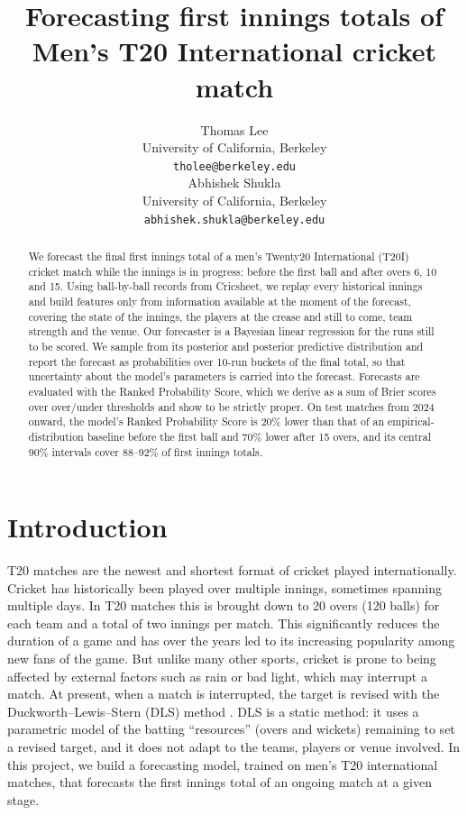 \documentclass{article}
\title{Forecasting first innings totals of Men's T20 International cricket match}
\author{
    {\hspace{1mm}Thomas Lee} \\
	University of California, Berkeley\\
	\texttt{tholee@berkeley.edu} \\
    \And
    {\hspace{1mm}Abhishek Shukla} \\
	University of California, Berkeley\\
	\texttt{abhishek.shukla@berkeley.edu} \\
}
\newcommand{\1}{\mathbf{1}}
\begin{document}
\maketitle

\begin{abstract}
We forecast the final first innings total of a men's Twenty20 International (T20I) cricket match while the innings is in progress: before the first ball and after overs 6, 10 and 15. Using ball-by-ball records from Cricsheet, we replay every historical innings and build features only from information available at the moment of the forecast, covering the state of the innings, the players at the crease and still to come, team strength and the venue. Our forecaster is a Bayesian linear regression for the runs still to be scored. We sample from its posterior and posterior predictive distribution and report the forecast as probabilities over 10-run buckets of the final total, so that uncertainty about the model's parameters is carried into the forecast. Forecasts are evaluated with the Ranked Probability Score, which we derive as a sum of Brier scores over over/under thresholds and show to be strictly proper. On test matches from 2024 onward, the model's Ranked Probability Score is 20\% lower than that of an empirical-distribution baseline before the first ball and 70\% lower after 15 overs, and its central 90\% intervals cover 88--92\% of first innings totals.
\end{abstract}




\section{Introduction}
T20 matches are the newest and shortest format of cricket played internationally. Cricket has historically been played over multiple innings, sometimes spanning multiple days. In T20 matches this is brought down to 20 overs (120 balls) for each team and a total of two innings per match. This significantly reduces the duration of a game and has over the years led to its increasing popularity among new fans of the game. But unlike many other sports, cricket is prone to being affected by external factors such as rain or bad light, which may interrupt a match. At present, when a match is interrupted, the target is revised with the Duckworth--Lewis--Stern (DLS) method \citep{duckworth1998,stern2016}. DLS is a static method: it uses a parametric model of the batting ``resources'' (overs and wickets) remaining to set a revised target, and it does not adapt to the teams, players or venue involved. In this project, we build a forecasting model, trained on men's T20 international matches, that forecasts the first innings total of an ongoing match at a given stage.
\end{document}
